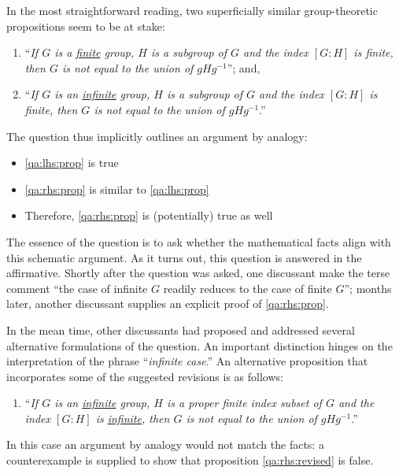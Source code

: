 \documentclass[smallextended,oneside]{svjour3}       %
\newcounter{turn}
\begin{document}
\noindent 
In the most straightforward reading, two superficially similar group-theoretic propositions seem
to be at stake:
\begin{enumerate}[label=(\emph{P\arabic*}),ref=(\emph{P\arabic*}),leftmargin=1cm]
\item ``\emph{If $G$ is a \uline{finite} group, $H$ is a subgroup of $G$ and the
  index $[G \mathop{:} H]$ is finite, then $G$ is not equal to the
  union of $gHg^{-1}$}''; and, \label{qa:lhs:prop}
\item ``\emph{If $G$ is an \uline{infinite} group, $H$ is a subgroup of $G$
  and the index $[G \mathop{:} H]$ is finite, then $G$ is not equal to
  the union of $gHg^{-1}$}.'' \label{qa:rhs:prop}
\end{enumerate}
The question thus implicitly outlines an argument by analogy:
\begin{itemize}
\item \ref{qa:lhs:prop} is true
\item \ref{qa:rhs:prop} is similar to \ref{qa:lhs:prop}
\item Therefore, \ref{qa:rhs:prop} is (potentially) true as well
\end{itemize} 
The essence of the question is to ask whether the mathematical facts
align with this schematic argument.
As it turns out, this question is answered in the affirmative.
Shortly after the question was asked, one discussant make the terse
comment ``the case of infinite $G$ readily reduces to the case of
finite $G$''; months later, another discussant supplies an explicit
proof of \ref{qa:rhs:prop}.

In the mean time, other discussants had proposed and addressed several
alternative formulations of the question.  An important distinction hinges on the
interpretation of the phrase ``\emph{infinite case}.''
An alternative proposition that incorporates some of the suggested
revisions is as follows:
\begin{enumerate}[start=2,label=(\emph{P\arabic*}$^\prime$),ref=(\emph{P\arabic*}$^\prime$),leftmargin=1cm]
\item ``\emph{If $G$ is an \uline{infinite} group, $H$ is a proper finite index subset of $G$
  and the index $[G \mathop{:} H]$ is \uline{infinite}, then $G$ is not equal to
  the union of $gHg^{-1}$}.'' \label{qa:rhs:revised}
\end{enumerate}
In this case an argument by analogy would not match the facts:
a counterexample is supplied to show that proposition \ref{qa:rhs:revised} is false.
\end{document}
